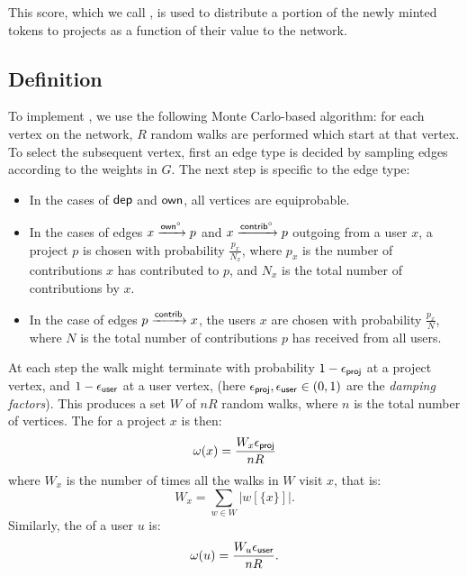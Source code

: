 


This score, which we call \osrank{}, is used to distribute a portion of the
newly minted tokens to projects as a function of their value to the \oscoin{} network.

\subsection{Definition}

To implement \osrank{}, we use the following Monte Carlo-based algorithm: for
each vertex on the network, $R$ random walks are performed which start at that
vertex. To select the subsequent vertex, first an edge type is decided
by sampling edges according to the weights in $G$. The next step is specific to
the edge type:

\begin{itemize}
\item In the cases of $\mathsf{dep}$ and $\mathsf{own}$, all vertices are equiprobable.
\item In the cases of edges $x \xrightarrow[]{\mathsf{own}^\circ} p$ and
  $x \xrightarrow[]{\mathsf{contrib}^\circ} p$ outgoing from a user $x$, a project $p$ is
  chosen with probability $\frac{p_x}{N_x}$, where $p_x$ is the number of
  contributions $x$ has contributed to $p$, and $N_x$ is the total number of
  contributions by $x$.
\item In the case of edges $p \xrightarrow[]{\mathsf{contrib}} x$, the users $x$ are
  chosen with probability $\frac{p_x}{N}$, where $N$ is the total number of
  contributions $p$ has received from all users.
\end{itemize}

At each step the walk might terminate with probability $1 - \epsilon_{\mathsf{proj}}$ at a
project vertex, and $1 - \epsilon_{\mathsf{user}}$ at a user vertex, (here
$\epsilon_{\mathsf{proj}}, \epsilon_{\mathsf{user}} \in (0,1)$ are the \emph{damping factors}). This
produces a set $W$ of $nR$ random walks, where $n$ is the total number of
vertices. The \osrank{} for a project $x$ is then:
\[
  \omega(x) = \frac{W_x \epsilon_{\mathsf{proj}}}{n R}
\]
where $W_x$ is the number of times all the walks in $W$ visit $x$, that is:
\[
W_x = \sum_{w \in W} |w[\{x\}]|.
\]
Similarly, the \osrank{} of a user $u$ is:
\[
  \omega(u) = \frac{W_u \epsilon_{\mathsf{user}}}{n R}.
\]

